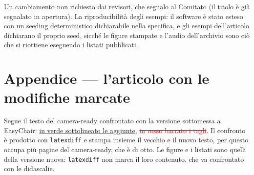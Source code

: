\documentclass[11pt,a4paper]{article}
\begin{document}
Un cambiamento non richiesto dai revisori, che segnalo al Comitato (il
titolo è già segnalato in apertura). La riproducibilità degli esempi: il software è stato
esteso con un seeding deterministico dichiarabile nella specifica, e gli
esempi dell'articolo dichiarano il proprio seed, sicché le figure stampate e
l'audio dell'archivio sono ciò che si riottiene eseguendo i listati
pubblicati.

\clearpage
\section*{Appendice --- l'articolo con le modifiche marcate}

Segue il testo del camera-ready confrontato con la versione sottomessa a
EasyChair: \textcolor[rgb]{0,0.55,0}{\uline{in verde sottolineato le
aggiunte}}, \textcolor{red}{\sout{in rosso barrato i tagli}}. Il confronto
è prodotto con \texttt{latexdiff} e stampa insieme il vecchio e il nuovo
testo, per questo occupa più pagine del camera-ready, che è di otto. Le
figure e i listati sono quelli della versione nuova: \texttt{latexdiff} non
marca il loro contenuto, che va confrontato con le didascalie.


\end{document}
